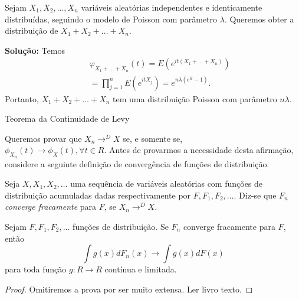 %
%
%
%


\begin{frame}

\begin{exem}
Sejam $X_1,X_2,\ldots,X_n$ variáveis aleatórias independentes e identicamente distribuídas, seguindo o modelo de Poisson com parâmetro $\lambda$. Queremos obter a distribuição de $X_1+X_2+\ldots+X_n$.

{\bf Solução:} Temos
\begin{eqnarray}
& & \varphi_{X_1+\ldots+X_n}(t)=E(e^{it(X_1+\ldots+X_n)})\nonumber\\
& & =\prod_{j=1}^{n}E(e^{itX_j})=e^{n\lambda(e^{it}-1)}.\nonumber
\end{eqnarray}
Portanto, $X_1+X_2+\ldots+X_n$ tem uma distribuição Poisson com parâmetro $n\lambda$.
\end{exem}
%
\end{frame}

\begin{frame}{Teorema da Continuidade de Levy}


Queremos provar que $X_n\rightarrow^D X$ se, e
somente se,\\ $\phi_{X_n}(t)\rightarrow\phi_X(t),\forall t\in R$.
Antes de provarmos a necessidade desta afirmação, considere a seguinte definição de convergência de funções de distribuição.

\begin{defi}
Seja $X,X_1,X_2,\ldots$ uma sequência de variáveis aleatórias com funções de distribuição acumuladas dadas respectivamente por $F,F_1,F_2,\ldots$. Diz-se que $F_n$ {\em converge fracamente} para $F$, se $X_n\rightarrow^D X$.
\end{defi}



\begin{teo} Sejam $F,F_1,F_2,\ldots$ funções de
distribuição. Se $F_n$ converge fracamente para $F$, então
$$\int g(x)dF_n(x)\rightarrow \int g(x)dF(x)$$
para toda função $g:R\rightarrow R$ contínua e limitada.
\end{teo}
\begin{proof}
	Omitiremos a prova por ser muito extensa. Ler livro texto.
	\end{proof}
\end{frame}

